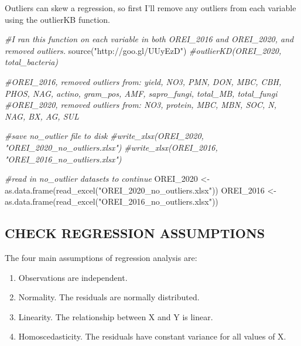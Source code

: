\documentclass[
]{article}
\newenvironment{Shaded}{\begin{snugshade}}{\end{snugshade}}
\newcommand{\CommentTok}[1]{\textcolor[rgb]{0.56,0.35,0.01}{\textit{#1}}}
\newcommand{\FunctionTok}[1]{\textcolor[rgb]{0.00,0.00,0.00}{#1}}
\newcommand{\NormalTok}[1]{#1}
\newcommand{\OtherTok}[1]{\textcolor[rgb]{0.56,0.35,0.01}{#1}}
\newcommand{\StringTok}[1]{\textcolor[rgb]{0.31,0.60,0.02}{#1}}
\providecommand{\tightlist}{%
  \setlength{\itemsep}{0pt}\setlength{\parskip}{0pt}}
\begin{document}
Outliers can skew a regression, so first I'll remove any outliers from
each variable using the outlierKB function.

\begin{Shaded}
\begin{Highlighting}[]
\CommentTok{\#I ran this function on each variable in both OREI\_2016 and OREI\_2020, and removed outliers.}
\FunctionTok{source}\NormalTok{(}\StringTok{"http://goo.gl/UUyEzD"}\NormalTok{)}
  \CommentTok{\#outlierKD(OREI\_2020, total\_bacteria)}

\CommentTok{\#OREI\_2016, removed outliers from: yield, NO3, PMN, DON, MBC, CBH, PHOS, NAG, actino,  gram\_pos, AMF, sapro\_fungi, total\_MB, total\_fungi}
\CommentTok{\#OREI\_2020, removed outliers from: NO3, protein, MBC, MBN, SOC, N, NAG, BX, AG, SUL}

\CommentTok{\#save no\_outlier file to disk}
\CommentTok{\#write\_xlsx(OREI\_2020, "OREI\_2020\_no\_outliers.xlsx")}
\CommentTok{\#write\_xlsx(OREI\_2016, "OREI\_2016\_no\_outliers.xlsx")}

\CommentTok{\#read in no\_outlier datasets to continue}
\NormalTok{OREI\_2020 }\OtherTok{\textless{}{-}} \FunctionTok{as.data.frame}\NormalTok{(}\FunctionTok{read\_excel}\NormalTok{(}\StringTok{"OREI\_2020\_no\_outliers.xlsx"}\NormalTok{))}
\NormalTok{OREI\_2016 }\OtherTok{\textless{}{-}} \FunctionTok{as.data.frame}\NormalTok{(}\FunctionTok{read\_excel}\NormalTok{(}\StringTok{"OREI\_2016\_no\_outliers.xlsx"}\NormalTok{))}
\end{Highlighting}
\end{Shaded}

\hypertarget{check-regression-assumptions}{%
\subsection{CHECK REGRESSION
ASSUMPTIONS}\label{check-regression-assumptions}}

The four main assumptions of regression analysis are:

\begin{enumerate}
\def\labelenumi{\arabic{enumi}.}
\tightlist
\item
  Observations are independent.
\item
  Normality. The residuals are normally distributed.
\item
  Linearity. The relationship between X and Y is linear.
\item
  Homoscedasticity. The residuals have constant variance for all values
  of X.
\end{enumerate}
\end{document}
